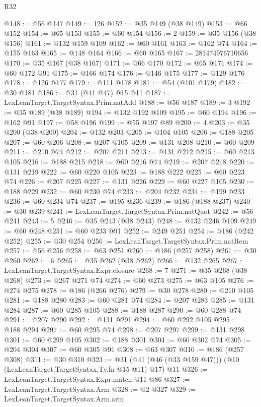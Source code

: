 \begin{lexlean}{R32}
\begin{coremodule}
@148 := @56 @147
@149 := 126
@152 := @35 @149 (@38 @149)
@153 := @66 @152
@154 := @65 @153
@155 := @60 @154
@156 := 2
@159 := @35 @156 (@38 @156)
@161 := @132 @159 @109
@162 := @60 @161
@163 := @162 @74
@164 := @155 @163
@165 := @148 @164
@166 := @60 @165
@167 := 281474976710656
@170 := @35 @167 (@38 @167)
@171 := @66 @170
@172 := @65 @171
@174 := @60 @172 @91
@175 := @166 @174
@176 := @146 @175
@177 := @129 @176
@178 := @126 @177
@179 := @111 @178
@181 := @54 (@101 @179)
@182 := @30 @181
@186 := @31 (@41 @47) @15 @11
@187 := LexLeanTarget.TargetSyntax.Prim.natAdd
@188 := @56 @187
@189 := 3
@192 := @35 @189 (@38 @189)
@194 := @132 @192 @109
@195 := @60 @194
@196 := @162 @91
@197 := @58 @196
@199 := @55 @197 @89
@200 := 4
@203 := @35 @200 (@38 @200)
@204 := @132 @203
@205 := @104 @105
@206 := @188 @205
@207 := @60 @206
@208 := @207 @105
@209 := @131 @208
@210 := @60 @209
@211 := @210 @74
@212 := @207 @211
@213 := @131 @212
@215 := @60 @213 @105
@216 := @188 @215
@218 := @60 @216 @74
@219 := @207 @218
@220 := @131 @219
@222 := @60 @220 @105
@223 := @188 @222
@225 := @60 @223 @74
@226 := @207 @225
@227 := @131 @226
@229 := @60 @227 @105
@230 := @188 @229
@232 := @60 @230 @74
@233 := @204 @232
@234 := @199 @233
@236 := @60 @234 @74
@237 := @195 @236
@239 := @186 (@188 @237)
@240 := @30 @239
@241 := LexLeanTarget.TargetSyntax.Prim.natQuot
@242 := @56 @241
@243 := 5
@246 := @35 @243 (@38 @243)
@248 := @132 @246 @109
@249 := @60 @248
@251 := @60 @233 @91
@252 := @249 @251
@254 := @186 (@242 @252)
@255 := @30 @254
@256 := LexLeanTarget.TargetSyntax.Prim.natRem
@257 := @56 @256
@258 := @63 @251
@260 := @186 (@257 @258)
@261 := @30 @260
@262 := 6
@265 := @35 @262 (@38 @262)
@266 := @132 @265
@267 := LexLeanTarget.TargetSyntax.Expr.closure
@268 := 7
@271 := @35 @268 (@38 @268)
@273 := @267 @271 @74
@274 := @60 @273
@275 := @63 @105
@276 := @274 @275
@278 := @186 (@266 @276)
@279 := @30 @278
@280 := @210 @105
@281 := @188 @280
@283 := @60 @281 @74
@284 := @207 @283
@285 := @131 @284
@287 := @60 @285 @105
@288 := @188 @287
@290 := @60 @288 @74
@291 := @207 @290
@292 := @131 @291
@294 := @60 @292 @105
@295 := @188 @294
@297 := @60 @295 @74
@298 := @207 @297
@299 := @131 @298
@301 := @60 @299 @105
@302 := @188 @301
@304 := @60 @302 @74
@305 := @204 @304
@307 := @60 @305 @91
@308 := @63 @307
@310 := @186 (@257 @308)
@311 := @30 @310
@323 := @31 (@41 (@46 (@33 @159 @47))) (@10 (LexLeanTarget.TargetSyntax.Ty.fn @15 @11) @17) @11
@326 := LexLeanTarget.TargetSyntax.Expr.match @11 @86
@327 := LexLeanTarget.TargetSyntax.Arm
@328 := @2 @327
@329 := LexLeanTarget.TargetSyntax.Arm.arm

\end{coremodule}
\end{lexlean}
